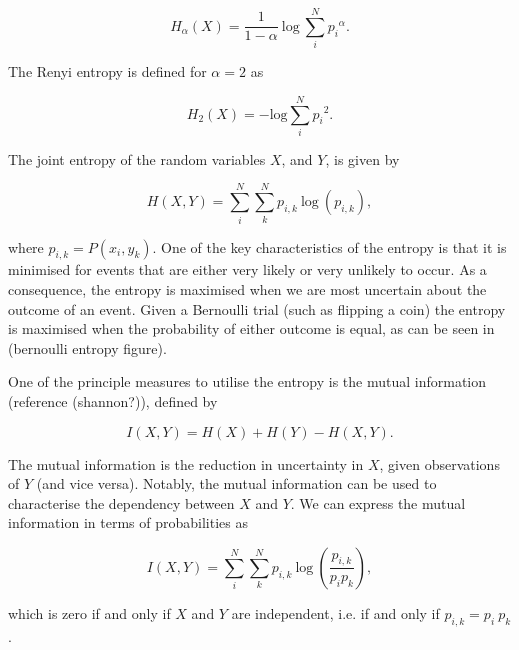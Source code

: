\begin{equation}
	H_\alpha(X) = \frac{1}{1 -\alpha} \: \text{log}\:\sum_i^N{{p_i}^\alpha}.
\end{equation}

\noindent The Renyi entropy is defined for $\alpha = 2$ as 

\begin{equation}
	H_2(X) = - \text{log} \sum_i^N{{p_i}^2}.
\end{equation}

\noindent The joint entropy of the random variables $X$, and $Y$, is given by

\begin{equation}
	H(X, Y) = \sum_i^N\sum_k^N{p_{i,k} \: \text{log} \: (p_{i,k})},
\end{equation}

\noindent where $p_{i,k} = P(x_i,y_k)$. One of the key characteristics of the entropy is that it is minimised for events that are either very likely or very unlikely to occur. As a consequence, the entropy is maximised when we are most uncertain about the outcome of an event. Given a Bernoulli trial (such as flipping a coin) the entropy is maximised when the probability of either outcome is equal, as can be seen in (bernoulli entropy figure). 


One of the principle measures to utilise the entropy is the mutual information (reference (shannon?)), defined by

\begin{equation}
	I(X, Y) = H(X) + H(Y)  - H(X, Y).
\end{equation}

The mutual information is the reduction in uncertainty in $X$, given observations of $Y$ (and vice versa). Notably, the mutual information can be used to characterise the dependency between $X$ and $Y$. We can express the mutual information in terms of probabilities as 


\begin{equation}
	I(X, Y) = \sum_i^N\sum_k^N{p_{i,k} \: \text{log} \: (\frac{p_{i,k}}{p_ip_k})},
\end{equation}

\noindent which is zero if and only if $X$ and $Y$ are independent, i.e. if and only if $p_{i,k} = p_i\:p_k$. 

